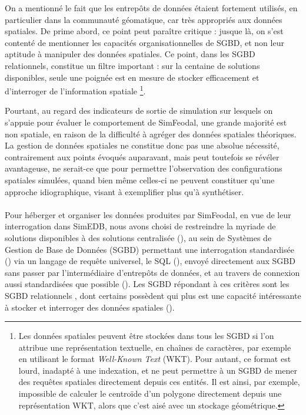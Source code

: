 			On a mentionné le fait que les entrepôts de données étaient fortement utilisés, en particulier dans la communauté géomatique, car très appropriés aux données spatiales.
			De prime abord, ce point peut paraître critique : jusque là, on s'est contenté de mentionner les capacités organisationnelles de SGBD, et non leur aptitude à manipuler des données spatiales.
			Ce point, dans les SGBD relationnels, constitue un filtre important : sur la centaine de solutions disponibles, seule une poignée est en mesure de stocker efficacement et d'interroger de l'information spatiale \footnote{
				Les données spatiales peuvent être stockées dans tous les SGBD si l'on attribue une représentation textuelle, en chaînes de caractères, par exemple en utilisant le format \textit{Well-Known Text} (WKT). Pour autant, ce format est lourd, inadapté à une indexation, et ne peut permettre à un SGBD de mener des requêtes spatiales directement depuis ces entités. Il est ainsi, par exemple, impossible de calculer le centroïde d'un polygone directement depuis une représentation WKT, alors que c'est aisé avec un stockage géométrique.
			}.
		
			Pourtant, au regard des indicateurs de sortie de simulation sur lesquels on s'appuie pour évaluer le comportement de SimFeodal, une grande majorité est non spatiale, en raison de la difficulté à agréger des données spatiales théoriques.
			La gestion de données spatiales ne constitue donc pas une absolue nécessité, contrairement aux points évoqués auparavant, mais peut toutefois se révéler avantageuse, ne serait-ce que pour permettre l'observation des configurations spatiales simulées, quand bien même celles-ci ne peuvent constituer qu'une approche idiographique, visant à exemplifier plus qu'à synthétiser.
		
			\paragraph*{}
			Pour héberger et organiser les données produites par SimFeodal, en vue de leur interrogation dans SimEDB, nous avons choisi de restreindre la myriade de solutions disponibles à des solutions centralisée (), au sein de Systèmes de Gestion de Base de Données (SGBD) permettant une interrogation standardisée () via un langage de requête universel, le SQL (), envoyé directement aux SGBD sans passer par l'intermédiaire d'entrepôts de données, et au travers de connexion aussi standardisées que possible ().
			Les SGBD répondant à ces critères sont les SGBD \og relationnels \fg{}, dont certains possèdent qui plus est une capacité intéressante à stocker et interroger des données spatiales ().
				
